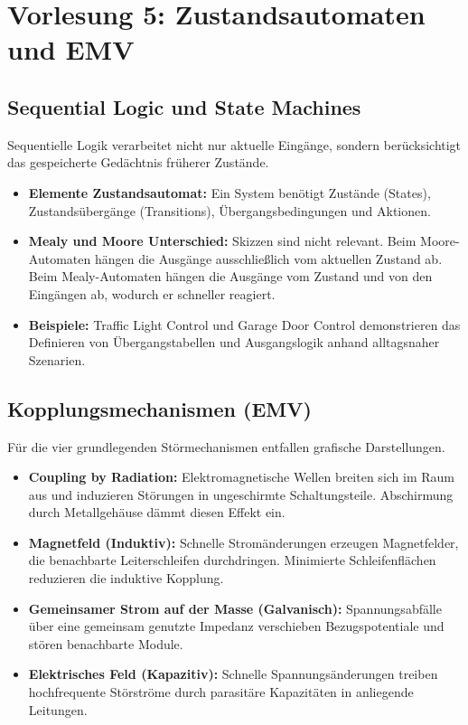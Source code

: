 \documentclass[11pt,a4paper]{article}
\begin{document}
\newpage

\section{Vorlesung 5: Zustandsautomaten und EMV}

\subsection{Sequential Logic und State Machines}
Sequentielle Logik verarbeitet nicht nur aktuelle Eingänge, sondern berücksichtigt das gespeicherte Gedächtnis früherer Zustände.
\begin{itemize}
    \item \textbf{Elemente Zustandsautomat:} Ein System benötigt Zustände (States), Zustandsübergänge (Transitions), Übergangsbedingungen und Aktionen.
    \item \textbf{Mealy und Moore Unterschied:} Skizzen sind nicht relevant. Beim Moore-Automaten hängen die Ausgänge ausschließlich vom aktuellen Zustand ab. Beim Mealy-Automaten hängen die Ausgänge vom Zustand und von den Eingängen ab, wodurch er schneller reagiert.
    \item \textbf{Beispiele:} Traffic Light Control und Garage Door Control demonstrieren das Definieren von Übergangstabellen und Ausgangslogik anhand alltagsnaher Szenarien.
\end{itemize}

\subsection{Kopplungsmechanismen (EMV)}
Für die vier grundlegenden Störmechanismen entfallen grafische Darstellungen.
\begin{itemize}
    \item \textbf{Coupling by Radiation:} Elektromagnetische Wellen breiten sich im Raum aus und induzieren Störungen in ungeschirmte Schaltungsteile. Abschirmung durch Metallgehäuse dämmt diesen Effekt ein.
    \item \textbf{Magnetfeld (Induktiv):} Schnelle Stromänderungen erzeugen Magnetfelder, die benachbarte Leiterschleifen durchdringen. Minimierte Schleifenflächen reduzieren die induktive Kopplung.
    \item \textbf{Gemeinsamer Strom auf der Masse (Galvanisch):} Spannungsabfälle über eine gemeinsam genutzte Impedanz verschieben Bezugspotentiale und stören benachbarte Module.
    \item \textbf{Elektrisches Feld (Kapazitiv):} Schnelle Spannungsänderungen treiben hochfrequente Störströme durch parasitäre Kapazitäten in anliegende Leitungen.
\end{itemize}
\end{document}
